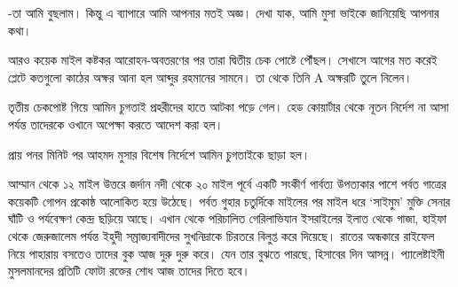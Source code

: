 \documentclass[
]{book}
\begin{document}
-তা আমি বুছলাম। কিন্তু এ ব্যাপারে আমি আপনার মতই অজ্ঞ। দেখা যাক, আমি মুসা ভাইকে জানিয়েছি আপনার কথা।

আরও কয়েক মাইল কষ্টকর আরোহন-অবতরণের পর তারা দ্বিতীয় চেক পোষ্টে পৌঁছল। সেখাসে আগের মত করেই প্লেটে কতগুলো কাঠের অক্ষর আনা হল আব্দুর রহমানের সামনে। তা থেকে তিনি A অক্ষরটি তুলে নিলেন।

তৃতীয় চেকপোষ্ট গিয়ে আমিন চুগতাই প্রহরীদের হাতে আটকা পড়ে গেল। হেড কোয়ার্টার থেকে নূতন নির্দেশ না আসা পর্যন্ত তাদেরকে ওখানে অপেক্ষা করতে আদেশ করা হল।

প্রায় পনর মিনিট পর আহমদ মুসার বিশেষ নির্দেশে আমিন চুগতাইকে ছাড়া হল।

আম্মান থেকে ১২ মাইল উত্তরে জর্দান নদী থেকে ২০ মাইল পূর্বে একটি সংকীর্ণ পার্বত্য উপত্যকার পাশে পর্বত গাত্রের কয়েকটি গোপন প্রকোষ্ঠ আলোকিত হয়ে উঠেছে। পর্বত গুহার চতুর্দিকে মাইলের পর মাইল ধরে `সাইমুম' মুক্তি সেনার ঘাঁটি ও পর্যবেক্ষণ কেন্দ্র ছড়িয়ে আছে। এখান থেকে পরিচালিত গেরিলাভিযান ইসরাইলের ইলাত থেকে গাজা, হাইফা থেকে জেরুজালেম পর্যন্ত ইহুদী সম্রাজ্যবাদীদের সুখনিদ্রাকে চিরতরে বিলুপ্ত করে দিয়েছে। রাতের অন্ধকারে রাইফেল নিয়ে পাহারায় বসতেও তাদের বুক আজ দুরু দুরু করে। যেন তার বুঝতে পারছে, হিসাবের দিন আসন্ন। প্যালেষ্টাইনী মুসলমানদের প্রতিটি ফোটা রক্তের শোধ আজ তাদের দিতে হবে।
\end{document}
